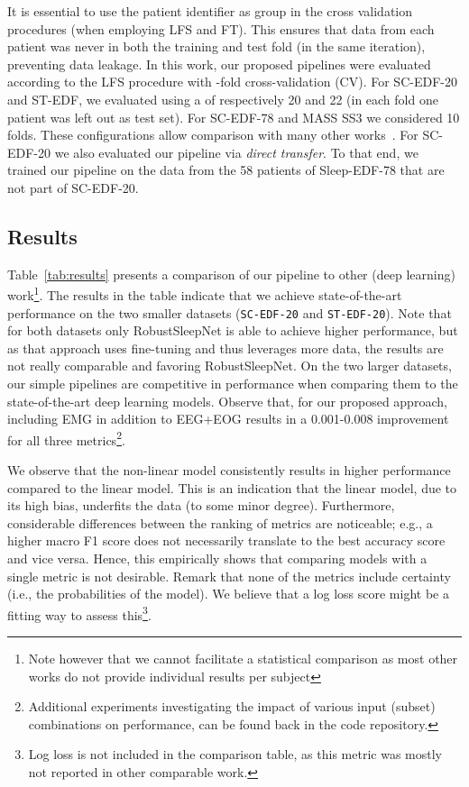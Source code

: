 \documentclass[runningheads]{llncs}
\begin{document}
It is essential to use the patient identifier as group in the cross validation procedures (when employing LFS and FT). This ensures that data from each patient was never in both the training and test fold (in the same iteration), preventing data leakage.
In this work, our proposed pipelines were evaluated according to the LFS procedure with -fold cross-validation (CV). For SC-EDF-20 and ST-EDF, we evaluated using a  of respectively 20 and 22 (in each fold one patient was left out as test set). For SC-EDF-78 and MASS SS3 we considered 10 folds. These configurations allow comparison with many other works~\cite{guillot2021robustsleepnet,phan2021xsleepnet,supratak2020tinysleepnet,guillot2020dreem__simplesleepnet,mousavi2019sleepeegnet,seo2020iitnet,supratak2017deepsleepnet,phan2022sleeptransformer}.
For SC-EDF-20 we also evaluated our pipeline via \textit{direct transfer}. To that end, we trained our pipeline on the data from the 58 patients of Sleep-EDF-78 that are not part of SC-EDF-20.

\subsection{Results}

Table~\ref{tab:results} presents a comparison of our pipeline to other (deep learning) work\footnote{Note however that we cannot facilitate a statistical comparison as most other works do not provide individual results per subject}. 
The results in the table indicate that we achieve state-of-the-art performance on the two smaller datasets (\texttt{SC-EDF-20} and \texttt{ST-EDF-20}). Note that for both datasets only RobustSleepNet is able to achieve higher performance, but as that approach uses fine-tuning and thus leverages more data, the results are not really comparable and favoring RobustSleepNet. On the two larger datasets, our simple pipelines are competitive in performance when comparing them to the state-of-the-art deep learning models. Observe that, for our proposed approach, including EMG in addition to EEG+EOG results in a 0.001-0.008 improvement for all three metrics\footnote{Additional experiments investigating the impact of various input (subset) combinations on performance, can be found back in the code repository.}.




We observe that the non-linear model consistently results in higher performance compared to the linear model. This is an indication that the linear model, due to its high bias, underfits the data (to some minor degree). 
Furthermore, considerable differences between the ranking of metrics are noticeable; e.g., a higher macro F1 score does not necessarily translate to the best accuracy score and vice versa. Hence, this empirically shows that comparing models with a single metric is not desirable. Remark that none of the metrics include certainty (i.e., the probabilities of the model). We believe that a log loss score might be a fitting way to assess this\footnote{Log loss is not included in the comparison table, as this metric was mostly not reported in other comparable work.}.
\end{document}
